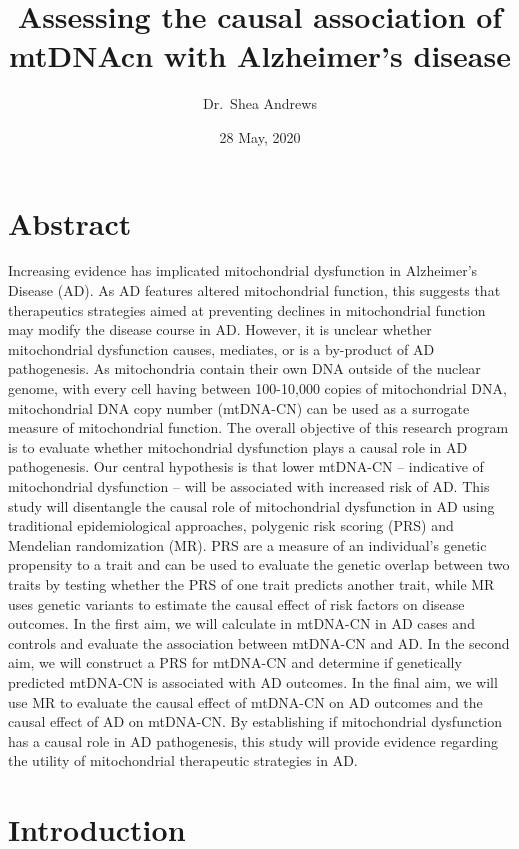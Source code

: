\documentclass[]{book}
\title{Assessing the causal association of mtDNAcn with Alzheimer's disease}
\author{Dr.~Shea Andrews}
\date{28 May, 2020}
\begin{document}
\maketitle

{
\setcounter{tocdepth}{1}
\tableofcontents
}
\hypertarget{abstract}{%
\chapter*{Abstract}\label{abstract}}

Increasing evidence has implicated mitochondrial dysfunction in Alzheimer's Disease (AD). As AD features altered mitochondrial function, this suggests that therapeutics strategies aimed at preventing declines in mitochondrial function may modify the disease course in AD. However, it is unclear whether mitochondrial dysfunction causes, mediates, or is a by-product of AD pathogenesis. As mitochondria contain their own DNA outside of the nuclear genome, with every cell having between 100-10,000 copies of mitochondrial DNA, mitochondrial DNA copy number (mtDNA-CN) can be used as a surrogate measure of mitochondrial function. The overall objective of this research program is to evaluate whether mitochondrial dysfunction plays a causal role in AD pathogenesis. Our central hypothesis is that lower mtDNA-CN -- indicative of mitochondrial dysfunction -- will be associated with increased risk of AD. This study will disentangle the causal role of mitochondrial dysfunction in AD using traditional epidemiological approaches, polygenic risk scoring (PRS) and Mendelian randomization (MR). PRS are a measure of an individual's genetic propensity to a trait and can be used to evaluate the genetic overlap between two traits by testing whether the PRS of one trait predicts another trait, while MR uses genetic variants to estimate the causal effect of risk factors on disease outcomes. In the first aim, we will calculate in mtDNA-CN in AD cases and controls and evaluate the association between mtDNA-CN and AD. In the second aim, we will construct a PRS for mtDNA-CN and determine if genetically predicted mtDNA-CN is associated with AD outcomes. In the final aim, we will use MR to evaluate the causal effect of mtDNA-CN on AD outcomes and the causal effect of AD on mtDNA-CN. By establishing if mitochondrial dysfunction has a causal role in AD pathogenesis, this study will provide evidence regarding the utility of mitochondrial therapeutic strategies in AD.

\hypertarget{intro}{%
\chapter{Introduction}\label{intro}}
\end{document}
